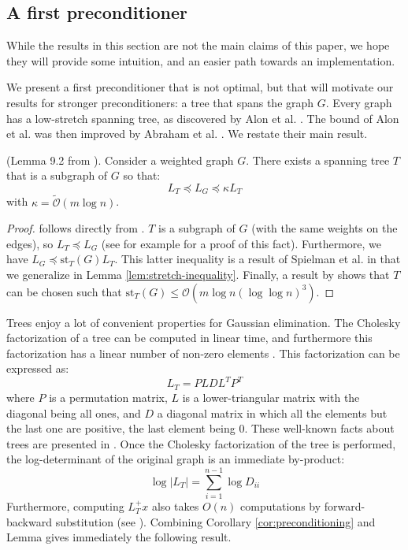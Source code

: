 
\subsection{A first preconditioner\label{sec:A-first-preconditioner}}

While the results in this section are not the main claims of this
paper, we hope they will provide some intuition, and an easier path
towards an implementation.

We present a first preconditioner that is not optimal, but that will
motivate our results for stronger preconditioners: a tree that spans
the graph $G$. Every graph has a low-stretch spanning tree, as discovered
by Alon et al. \cite{Alon1995}. The bound of Alon et al. was then
improved by Abraham et al. \cite{Abraham2008}. We restate their main
result.

\begin{lemma}(Lemma 9.2 from \cite{Spielman2009a}). Consider a weighted
graph $G$. There exists a spanning tree $T$ that is a subgraph of
$G$ so that: 
\[
L_{T}\preceq L_{G}\preceq\kappa L_{T}
\]
with $\kappa=\tilde{\mathcal{O}}\left(m\log n\right)$. %
\label{lem:tree-st} \end{lemma}

\begin{proof} 

follows directly from \cite{Spielman2009a}. $T$ is a subgraph of
$G$ (with the same weights on the edges), so $L_{T}\preceq L_{G}$
(see \cite{Spielman2009a} for example for a proof of this fact).
Furthermore, we have $L_{G}\preceq\text{st}_{T}\left(G\right)L_{T}$.
This latter inequality is a result of Spielman et al. in \cite{Spielman2010}
that we generalize in Lemma \ref{lem:stretch-inequality}. Finally,
a result by \cite{Abraham2008} shows that $T$ can be chosen such
that $\text{st}_{T}\left(G\right)\leq\mathcal{O}(m\log n(\log\log n)^{3})$.\end{proof}

Trees enjoy a lot of convenient properties for Gaussian elimination.
The Cholesky factorization of a tree can be computed in linear time,
and furthermore this factorization has a linear number of non-zero
elements \cite{Spielman2009a}. This factorization can be expressed
as: 
\[
L_{T}=PLDL^{T}P^{T}
\]
where $P$ is a permutation matrix, $L$ is a lower-triangular matrix
with the diagonal being all ones, and $D$ a diagonal matrix in which
all the elements but the last one are positive, the last element being
$0$. These well-known facts about trees are presented in \cite{Spielman2009a}.
Once the Cholesky factorization of the tree is performed, the log-determinant
of the original graph is an immediate by-product: 
\[
\log\left|L_{T}\right|=\sum_{i=1}^{n-1}\log D_{ii}
\]
Furthermore, computing $L_{T}^{+}x$ also takes $O\left(n\right)$
computations by forward-backward substitution (see \cite{duff1986direct}).
Combining Corollary \ref{cor:preconditioning} and Lemma \cite{lem:tree-st}
gives immediately the following result.

